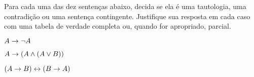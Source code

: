 \problempart
\label{pr.TT.TTorC3}
Para cada uma das dez sentenças abaixo, decida se ela é uma tautologia, uma contradição ou uma sentença contingente.
Justifique sua resposta em cada caso com uma tabela de verdade completa ou, quando for apropriado, parcial.


\begin{earg}
\item  $A \rightarrow \neg A$ \vspace{.5ex}							

%
\item $A \rightarrow (A \wedge (A \vee B))$ \vspace{.5ex}	

%

\item $(A \rightarrow B) \leftrightarrow (B \rightarrow A)$ 	\vspace{.5ex}				%
%
%
%


\end{earg}
